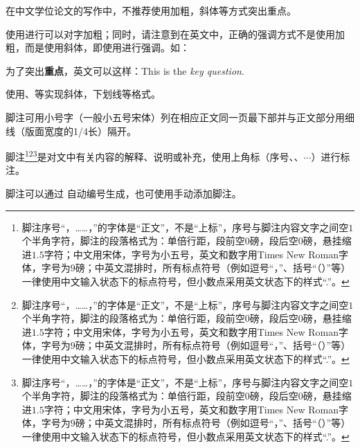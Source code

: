\clearpage


在中文学位论文的写作中，不推荐使用加粗，斜体等方式突出重点。

使用进行可以对字加粗；同时，请注意到在英文中，正确的强调方式不是使用加粗，而是使用斜体，即使用进行强调。如：
\begin{texcode}[]{}
  为了突出\textbf{重点}，英文可以这样：This is the \emph{key question}.
\end{texcode}

使用、等实现斜体，下划线等格式。






\begin{tcolorbox}[colback=red!5!white,colframe=red!75!black]
  脚注可用小号字（一般小五号宋体）列在相应正文同一页最下部并与正文部分用细线（版面宽度的1/4长）隔开。
\end{tcolorbox}

脚注\footnote{脚注序号“，……，”的字体是“正文”，不是“上标”，序号与脚注内容文字之间空$1$个半角字符，脚注的段落格式为：单倍行距，段前空$0$磅，段后空$0$磅，悬挂缩进$1.5$字符；中文用宋体，字号为小五号，英文和数字用Times New Roman字体，字号为$9$磅；中英文混排时，所有标点符号（例如逗号“，”、括号“（）”等）一律使用中文输入状态下的标点符号，但小数点采用英文状态下的样式“.”。}\footnote{脚注序号“，……，”的字体是“正文”，不是“上标”，序号与脚注内容文字之间空$1$个半角字符，脚注的段落格式为：单倍行距，段前空$0$磅，段后空$0$磅，悬挂缩进$1.5$字符；中文用宋体，字号为小五号，英文和数字用Times New Roman字体，字号为$9$磅；中英文混排时，所有标点符号（例如逗号“，”、括号“（）”等）一律使用中文输入状态下的标点符号，但小数点采用英文状态下的样式“.”。}\footnote{脚注序号“，……，”的字体是“正文”，不是“上标”，序号与脚注内容文字之间空$1$个半角字符，脚注的段落格式为：单倍行距，段前空$0$磅，段后空$0$磅，悬挂缩进$1.5$字符；中文用宋体，字号为小五号，英文和数字用Times New Roman字体，字号为$9$磅；中英文混排时，所有标点符号（例如逗号“，”、括号“（）”等）一律使用中文输入状态下的标点符号，但小数点采用英文状态下的样式“.”。}是对文中有关内容的解释、说明或补充，使用上角标（序号、、$\cdots$）进行标注。

脚注可以通过 \clist{\footnote{}}自动编号生成，也可使用手动添加脚注。

